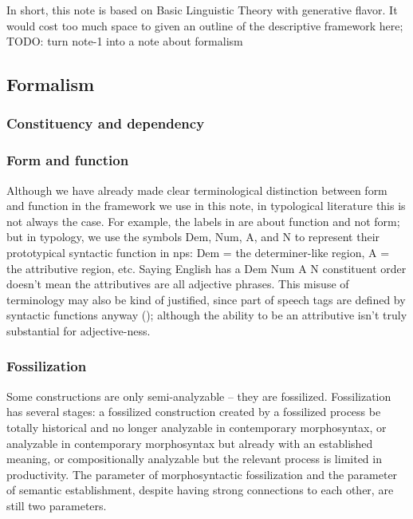 \documentclass[UTF8, a4paper, oneside, scheme=plain, 12pt]{ctexbook}
\begin{document}
{\small

In short, this note is based on Basic Linguistic Theory 
\citep{dixon2009basic1,dixon2010basic2,dixon2012basic3}
with generative flavor.
It would cost too much space to given an outline of the descriptive framework here; 
TODO: turn note-1 into a note about formalism

\subsection{Formalism}

\subsubsection{Constituency and dependency}

\subsubsection{Form and function}

Although we have already made clear terminological distinction between form and function 
in the framework we use in this note, 
in typological literature this is not always the case. 
For example, the labels in  are about function and not form;
but in typology, we use the symbols Dem, Num, A, and N to represent
their prototypical syntactic function in \acs{np}s:
Dem = the determiner-like region, 
A = the attributive region, etc. 
Saying English has a Dem Num A N constituent order 
doesn't mean the attributives are all adjective phrases.
This misuse of terminology may also be kind of justified,
since part of speech tags are defined by syntactic functions anyway
(); 
although the ability to be an attributive isn't truly substantial 
for adjective-ness.

\subsubsection{Fossilization}

Some constructions are only semi-analyzable -- 
they are fossilized.
Fossilization has several stages:
a fossilized construction created by a fossilized process 
be totally historical and no longer analyzable in contemporary morphosyntax,
or analyzable in contemporary morphosyntax but already with an established meaning,
or compositionally analyzable but the relevant process is limited in productivity.
The parameter of morphosyntactic fossilization 
and the parameter of semantic establishment,
despite having strong connections to each other,
are still two parameters.

}
\end{document}
